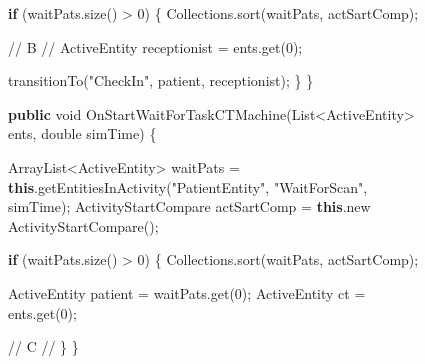 \documentclass[
  10pt,
  a4paperpaper,
  DIV=11,
  numbers=noendperiod,
  oneside]{scrreprt}
\newenvironment{Shaded}{\begin{snugshade}}{\end{snugshade}}
\newcommand{\BuiltInTok}[1]{\textcolor[rgb]{0.00,0.23,0.31}{#1}}
\newcommand{\CommentTok}[1]{\textcolor[rgb]{0.37,0.37,0.37}{#1}}
\newcommand{\ControlFlowTok}[1]{\textcolor[rgb]{0.00,0.23,0.31}{\textbf{#1}}}
\newcommand{\DataTypeTok}[1]{\textcolor[rgb]{0.68,0.00,0.00}{#1}}
\newcommand{\DecValTok}[1]{\textcolor[rgb]{0.68,0.00,0.00}{#1}}
\newcommand{\FunctionTok}[1]{\textcolor[rgb]{0.28,0.35,0.67}{#1}}
\newcommand{\KeywordTok}[1]{\textcolor[rgb]{0.00,0.23,0.31}{\textbf{#1}}}
\newcommand{\NormalTok}[1]{\textcolor[rgb]{0.00,0.23,0.31}{#1}}
\newcommand{\OperatorTok}[1]{\textcolor[rgb]{0.37,0.37,0.37}{#1}}
\newcommand{\StringTok}[1]{\textcolor[rgb]{0.13,0.47,0.30}{#1}}
\begin{document}
\begin{figure}
\begin{codebox}
\begin{Shaded}
\begin{Highlighting}[numbers=left,,]
  \ControlFlowTok{if} \OperatorTok{(}\NormalTok{waitPats}\OperatorTok{.}\FunctionTok{size}\OperatorTok{()} \OperatorTok{\textgreater{}} \DecValTok{0}\OperatorTok{)} \OperatorTok{\{}
    \BuiltInTok{Collections}\OperatorTok{.}\FunctionTok{sort}\OperatorTok{(}\NormalTok{waitPats}\OperatorTok{,}\NormalTok{ actSartComp}\OperatorTok{);}
    
    \CommentTok{// B //}
\NormalTok{    ActiveEntity receptionist }\OperatorTok{=}\NormalTok{ ents}\OperatorTok{.}\FunctionTok{get}\OperatorTok{(}\DecValTok{0}\OperatorTok{);}

    \FunctionTok{transitionTo}\OperatorTok{(}\StringTok{"CheckIn"}\OperatorTok{,}\NormalTok{ patient}\OperatorTok{,}\NormalTok{ receptionist}\OperatorTok{);}
  \OperatorTok{\}}
\OperatorTok{\}}

\KeywordTok{public} \DataTypeTok{void} \FunctionTok{OnStartWaitForTaskCTMachine}\OperatorTok{(}\BuiltInTok{List}\OperatorTok{\textless{}}\NormalTok{ActiveEntity}\OperatorTok{\textgreater{}}\NormalTok{ ents}\OperatorTok{,} \DataTypeTok{double}\NormalTok{ simTime}\OperatorTok{)} \OperatorTok{\{}
  
  \BuiltInTok{ArrayList}\OperatorTok{\textless{}}\NormalTok{ActiveEntity}\OperatorTok{\textgreater{}}\NormalTok{ waitPats }\OperatorTok{=} \KeywordTok{this}\OperatorTok{.}\FunctionTok{getEntitiesInActivity}\OperatorTok{(}\StringTok{"PatientEntity"}\OperatorTok{,} \StringTok{"WaitForScan"}\OperatorTok{,}\NormalTok{ simTime}\OperatorTok{);}
\NormalTok{  ActivityStartCompare actSartComp }\OperatorTok{=} \KeywordTok{this}\OperatorTok{.}\FunctionTok{new} \FunctionTok{ActivityStartCompare}\OperatorTok{();}        
    
  \ControlFlowTok{if} \OperatorTok{(}\NormalTok{waitPats}\OperatorTok{.}\FunctionTok{size}\OperatorTok{()} \OperatorTok{\textgreater{}} \DecValTok{0}\OperatorTok{)} \OperatorTok{\{}
    \BuiltInTok{Collections}\OperatorTok{.}\FunctionTok{sort}\OperatorTok{(}\NormalTok{waitPats}\OperatorTok{,}\NormalTok{ actSartComp}\OperatorTok{);}
    
\NormalTok{    ActiveEntity patient }\OperatorTok{=}\NormalTok{ waitPats}\OperatorTok{.}\FunctionTok{get}\OperatorTok{(}\DecValTok{0}\OperatorTok{);}
\NormalTok{    ActiveEntity ct }\OperatorTok{=}\NormalTok{ ents}\OperatorTok{.}\FunctionTok{get}\OperatorTok{(}\DecValTok{0}\OperatorTok{);}

    \CommentTok{// C //}
  \OperatorTok{\}}
\OperatorTok{\}}
\end{Highlighting}
\end{Shaded}

\end{codebox}

\end{figure}%
\end{document}
